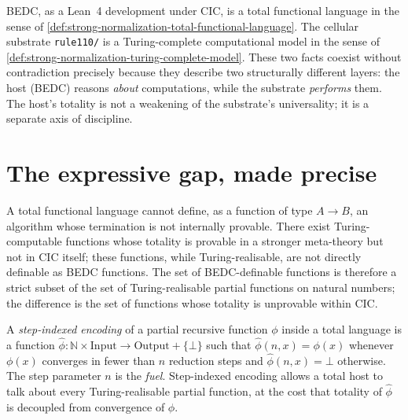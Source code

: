 \begin{principle}
\label{prin:strong-normalization-bedc-total-substrate-universal}
BEDC, as a Lean~4 development under CIC, is a total functional language in the sense of \autoref{def:strong-normalization-total-functional-language}. The cellular substrate \texttt{rule110/} is a Turing-complete computational model in the sense of \autoref{def:strong-normalization-turing-complete-model}. These two facts coexist without contradiction precisely because they describe two structurally different layers: the host (BEDC) reasons \emph{about} computations, while the substrate \emph{performs} them. The host's totality is not a weakening of the substrate's universality; it is a separate axis of discipline.
\end{principle}

\section{The expressive gap, made precise}
\label{sec:strong-normalization-expressive-gap}

\begin{remark}
\label{rem:strong-normalization-cannot-express}
A total functional language cannot define, as a function of type $A \to B$, an algorithm whose termination is not internally provable. There exist Turing-computable functions whose totality is provable in a stronger meta-theory but not in CIC itself; these functions, while Turing-realisable, are not directly definable as BEDC functions. The set of BEDC-definable functions is therefore a strict subset of the set of Turing-realisable partial functions on natural numbers; the difference is the set of functions whose totality is unprovable within CIC.
\end{remark}

\begin{definition}
\label{def:strong-normalization-step-indexed-encoding}
A \emph{step-indexed encoding} of a partial recursive function $\phi$ inside a total language is a function $\widehat{\phi} \colon \mathbb{N} \times \mathrm{Input} \to \mathrm{Output} + \{\bot\}$ such that $\widehat{\phi}(n, x) = \phi(x)$ whenever $\phi(x)$ converges in fewer than $n$ reduction steps and $\widehat{\phi}(n, x) = \bot$ otherwise. The step parameter $n$ is the \emph{fuel}. Step-indexed encoding allows a total host to talk about every Turing-realisable partial function, at the cost that totality of $\widehat{\phi}$ is decoupled from convergence of $\phi$.
\end{definition}

